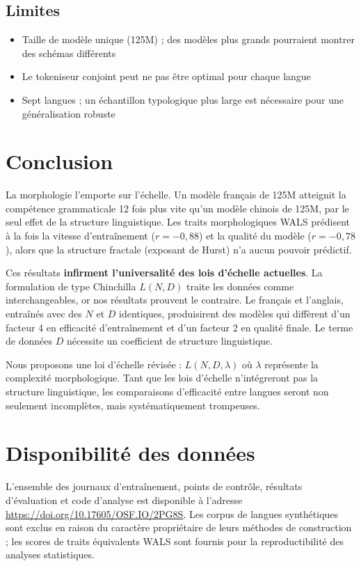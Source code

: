 \documentclass[11pt]{article}
\begin{document}
\subsection{Limites}

\begin{itemize}
    \item Taille de modèle unique (125M) ; des modèles plus grands pourraient montrer des schémas différents
    \item Le tokeniseur conjoint peut ne pas être optimal pour chaque langue
    \item Sept langues ; un échantillon typologique plus large est nécessaire pour une généralisation robuste
\end{itemize}

\section{Conclusion}

La morphologie l'emporte sur l'échelle. Un modèle français de 125M atteignit la compétence grammaticale 12 fois plus vite qu'un modèle chinois de 125M, par le seul effet de la structure linguistique. Les traits morphologiques WALS prédisent à la fois la vitesse d'entraînement ($r=-0,88$) et la qualité du modèle ($r=-0,78$), alors que la structure fractale (exposant de Hurst) n'a aucun pouvoir prédictif.

Ces résultats \textbf{infirment l'universalité des lois d'échelle actuelles}. La formulation de type Chinchilla $L(N,D)$ traite les données comme interchangeables, or nos résultats prouvent le contraire. Le français et l'anglais, entraînés avec des $N$ et $D$ identiques, produisirent des modèles qui diffèrent d'un facteur 4 en efficacité d'entraînement et d'un facteur 2 en qualité finale. Le terme de données $D$ nécessite un coefficient de structure linguistique.

Nous proposons une loi d'échelle révisée : $L(N, D, \lambda)$ où $\lambda$ représente la complexité morphologique. Tant que les lois d'échelle n'intégreront pas la structure linguistique, les comparaisons d'efficacité entre langues seront non seulement incomplètes, mais systématiquement trompeuses.

\section*{Disponibilité des données}

L'ensemble des journaux d'entraînement, points de contrôle, résultats d'évaluation et code d'analyse est disponible à l'adresse \url{https://doi.org/10.17605/OSF.IO/2PG8S}. Les corpus de langues synthétiques sont exclus en raison du caractère propriétaire de leurs méthodes de construction ; les scores de traits équivalents WALS sont fournis pour la reproductibilité des analyses statistiques.
\end{document}
